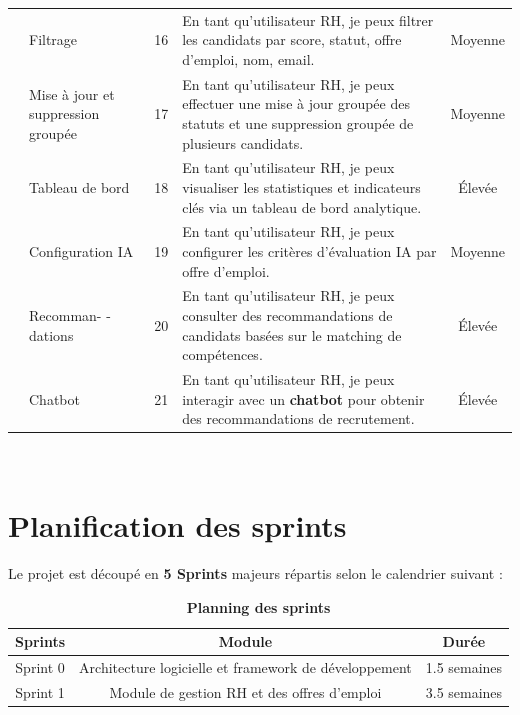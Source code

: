 \documentclass[12pt,a4paper,oneside]{report}
\begin{document}
\begin{itemize}
\begin{small}
\begin{xltabular}{\textwidth}{|>{\centering\arraybackslash}m{2cm}|>{\centering\arraybackslash}p{2.5cm}|c|X|c|}
& Filtrage & 16 & En tant qu'utilisateur RH, je peux filtrer les candidats par score, statut, offre d'emploi, nom, email. & Moyenne \\ 
& Mise à jour et suppression groupée & 17 & En tant qu'utilisateur RH, je peux effectuer une mise à jour groupée des statuts et une suppression groupée de plusieurs candidats. & Moyenne \\ 
& Tableau de bord & 18 & En tant qu'utilisateur RH, je peux visualiser les statistiques et indicateurs clés via un tableau de bord analytique. & Élevée \\ 
& Configuration IA & 19 & En tant qu'utilisateur RH, je peux configurer les critères d'évaluation IA par offre d'emploi. & Moyenne \\ 
& Recomman- \newline -dations & 20 & En tant qu'utilisateur RH, je peux consulter des recommandations de candidats basées sur le matching de compétences. & Élevée \\ 
& Chatbot & 21 & En tant qu'utilisateur RH, je peux interagir avec un \textbf{chatbot} pour obtenir des recommandations de recrutement. & Élevée \\ \hline

\end{xltabular}
\
\end{small}


\section{Planification des sprints}
Le projet est découpé en \textbf{5 Sprints} majeurs répartis selon le calendrier suivant :

\begin{table}[H]
\centering
\renewcommand{\arraystretch}{2}
\caption{\textbf{ Planning des sprints}} 
\vspace{0.5cm}
\begin{tabular}{|c|c|c|}

\hline

\textbf{Sprints} & \textbf{Module} & \textbf{Durée} \\
\hline

Sprint 0 & Architecture logicielle et
framework de développement & 1.5 semaines \\
\hline

Sprint 1 & Module de gestion RH et des offres d'emploi & 3.5 semaines \\
\hline


\end{tabular}
\end{table}
\end{itemize}
\end{document}

